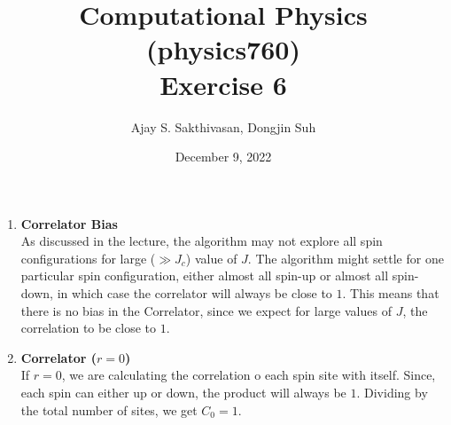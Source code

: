 \documentclass{article}
\title{Computational Physics (physics760)\\Exercise 6}
\author{Ajay S. Sakthivasan, Dongjin Suh}
\date{December 9, 2022}
\begin{document}
\maketitle

\begin{enumerate}

\item   \textbf{Correlator Bias}\\
As discussed in the lecture, the algorithm may not explore all spin configurations for large ($\gg J_c$) value of $J$. The algorithm might settle for one particular spin configuration, either almost all spin-up or almost all spin-down, in which case the correlator will always be close to $1$. This means that there is no bias in the Correlator, since we expect for large values of $J$, the correlation to be close to $1$.

\item \textbf{Correlator ($r = 0$)}\\
If $r=0$, we are calculating the correlation o each spin site with itself. Since, each spin can either up or down, the product will always be $1$. Dividing by the total number of sites, we get $C_0 = 1$.



\end{enumerate}
\end{document}
